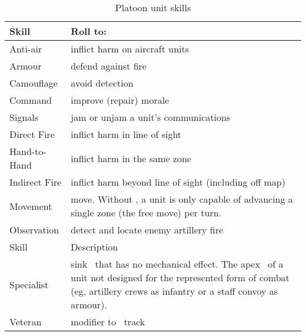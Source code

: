\begin{table}[ht]\centering
\begin{tabular}{lp{}}
\toprule
Skill		& Roll to: \\
\midrule
Anti-air	& inflict harm on aircraft units \\
Armour		& defend against fire \\
Camouflage	& avoid detection \\
Command		& improve (repair) morale \\
Signals		& jam or unjam a unit's communications \\
Direct Fire	& inflict harm in line of sight \\
Hand-to-Hand	& inflict harm in the same zone \\
Indirect Fire	& inflict harm beyond line of sight (including off map) \\
Movement	& move. Without \skill{Movement}, a unit is only capable of advancing a single zone (the free move) per turn. \\
Observation	& detect and locate enemy artillery fire \\
\midrule
Skill		& Description \\
\midrule
Specialist	& sink \Skill\ that has no mechanical effect. The apex \Skill\ of a unit not designed for the represented form of combat (eg, artillery crews as infantry or a staff convoy as armour). \\
Veteran		& modifier to \Morale\ track \\
\bottomrule
\end{tabular}
\caption{Platoon unit skills}
\label{tab:platoon-unit-skills}
\end{table}
